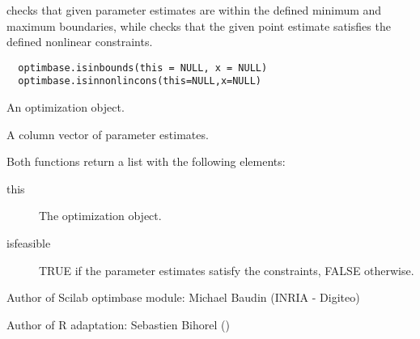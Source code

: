 %
\begin{Description}\relax
{} checks that given parameter estimates are within
the defined minimum and maximum boundaries, while
 checks that the given point estimate satisfies
the defined nonlinear constraints.
\end{Description}
%
\begin{Usage}
\begin{verbatim}
  optimbase.isinbounds(this = NULL, x = NULL)
  optimbase.isinnonlincons(this=NULL,x=NULL)
\end{verbatim}
\end{Usage}
%
\begin{Arguments}
\begin{ldescription}
\item[\code{this}] An optimization object.
\item[\code{x}] A column vector of parameter estimates.
\end{ldescription}
\end{Arguments}
%
\begin{Value}
Both functions return a list with the following elements: \begin{description}

\item[this] The optimization object.
\item[isfeasible] TRUE if the parameter estimates satisfy the constraints,
FALSE otherwise.

\end{description}

\end{Value}
%
\begin{Author}\relax
Author of Scilab optimbase module: Michael Baudin (INRIA - Digiteo)

Author of R adaptation: Sebastien Bihorel ()
\end{Author}
